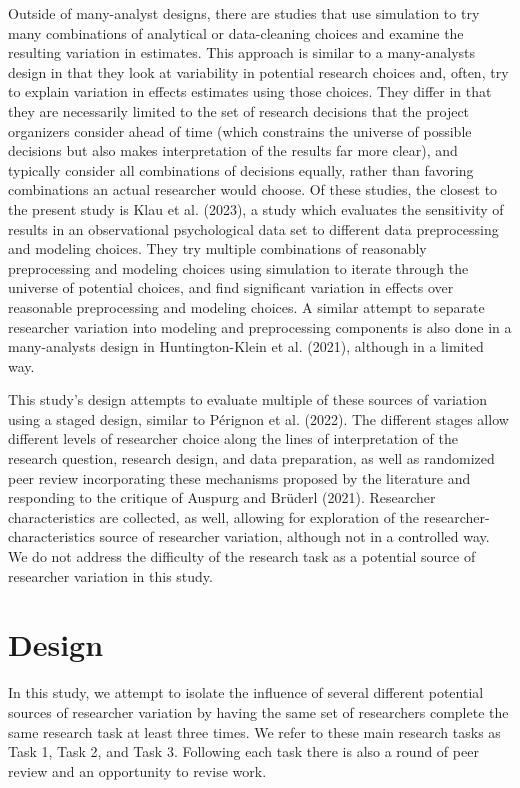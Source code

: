 \documentclass[
  letterpaper,
  DIV=11,
  numbers=noendperiod]{scrartcl}
\begin{document}
Outside of many-analyst designs, there are studies that use simulation
to try many combinations of analytical or data-cleaning choices and
examine the resulting variation in estimates. This approach is similar
to a many-analysts design in that they look at variability in potential
research choices and, often, try to explain variation in effects
estimates using those choices. They differ in that they are necessarily
limited to the set of research decisions that the project organizers
consider ahead of time (which constrains the universe of possible
decisions but also makes interpretation of the results far more clear),
and typically consider all combinations of decisions equally, rather
than favoring combinations an actual researcher would choose. Of these
studies, the closest to the present study is Klau et al. (2023), a study
which evaluates the sensitivity of results in an observational
psychological data set to different data preprocessing and modeling
choices. They try multiple combinations of reasonably preprocessing and
modeling choices using simulation to iterate through the universe of
potential choices, and find significant variation in effects over
reasonable preprocessing and modeling choices. A similar attempt to
separate researcher variation into modeling and preprocessing components
is also done in a many-analysts design in Huntington-Klein et al.
(2021), although in a limited way.

This study's design attempts to evaluate multiple of these sources of
variation using a staged design, similar to Pérignon et al. (2022). The
different stages allow different levels of researcher choice along the
lines of interpretation of the research question, research design, and
data preparation, as well as randomized peer review incorporating these
mechanisms proposed by the literature and responding to the critique of
Auspurg and Brüderl (2021). Researcher characteristics are collected, as
well, allowing for exploration of the researcher-characteristics source
of researcher variation, although not in a controlled way. We do not
address the difficulty of the research task as a potential source of
researcher variation in this study.

\hypertarget{design}{%
\section{Design}\label{design}}

In this study, we attempt to isolate the influence of several different
potential sources of researcher variation by having the same set of
researchers complete the same research task at least three times. We
refer to these main research tasks as Task 1, Task 2, and Task 3.
Following each task there is also a round of peer review and an
opportunity to revise work.
\end{document}
